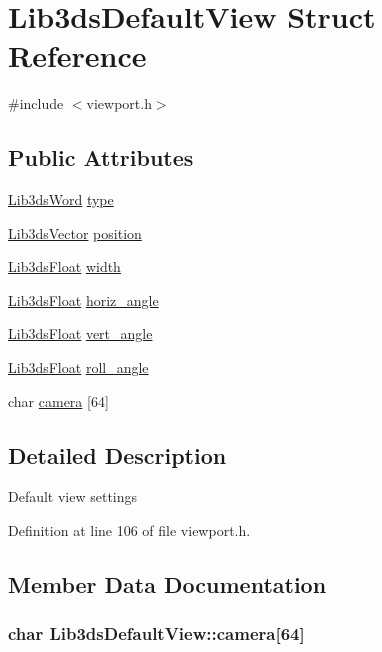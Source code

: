 \hypertarget{struct_lib3ds_default_view}{\section{Lib3ds\-Default\-View Struct Reference}
\label{struct_lib3ds_default_view}
}


{\ttfamily \#include $<$viewport.\-h$>$}

\subsection*{Public Attributes}
\begin{DoxyCompactItemize}
\item 
\hyperlink{types_8h_a439f68d12f4ad080599044949e41dba1}{Lib3ds\-Word} \hyperlink{struct_lib3ds_default_view_a0ec6d6dfbf5d9af2deb4fb2574e021b9}{type}
\item 
\hyperlink{group__vector_ga6ac1c3b3ef15381ebf6baf264d658dcf}{Lib3ds\-Vector} \hyperlink{struct_lib3ds_default_view_a48daa3b37edfe334950c5856ddbcdca8}{position}
\item 
\hyperlink{types_8h_ab18e70f51f9a53c9dee8d930c8e1a7bf}{Lib3ds\-Float} \hyperlink{struct_lib3ds_default_view_a2aeb68b068c4a4bea49d410fc1c0a73a}{width}
\item 
\hyperlink{types_8h_ab18e70f51f9a53c9dee8d930c8e1a7bf}{Lib3ds\-Float} \hyperlink{struct_lib3ds_default_view_a01616bc94938e25f10a7d8467204357b}{horiz\-\_\-angle}
\item 
\hyperlink{types_8h_ab18e70f51f9a53c9dee8d930c8e1a7bf}{Lib3ds\-Float} \hyperlink{struct_lib3ds_default_view_ae1ad24f01fc6c09fa04c2122802fa67d}{vert\-\_\-angle}
\item 
\hyperlink{types_8h_ab18e70f51f9a53c9dee8d930c8e1a7bf}{Lib3ds\-Float} \hyperlink{struct_lib3ds_default_view_af1ac12acdccfcc082222e35acb621107}{roll\-\_\-angle}
\item 
char \hyperlink{struct_lib3ds_default_view_aabb91fdf85ec7647273a827deb561da2}{camera} \mbox{[}64\mbox{]}
\end{DoxyCompactItemize}


\subsection{Detailed Description}
Default view settings 

Definition at line 106 of file viewport.\-h.



\subsection{Member Data Documentation}
\hypertarget{struct_lib3ds_default_view_aabb91fdf85ec7647273a827deb561da2}{
\subsubsection[{camera}]{\setlength{\rightskip}{0pt plus 5cm}char Lib3ds\-Default\-View\-::camera\mbox{[}64\mbox{]}}}\label{struct_lib3ds_default_view_aabb91fdf85ec7647273a827deb561da2}


